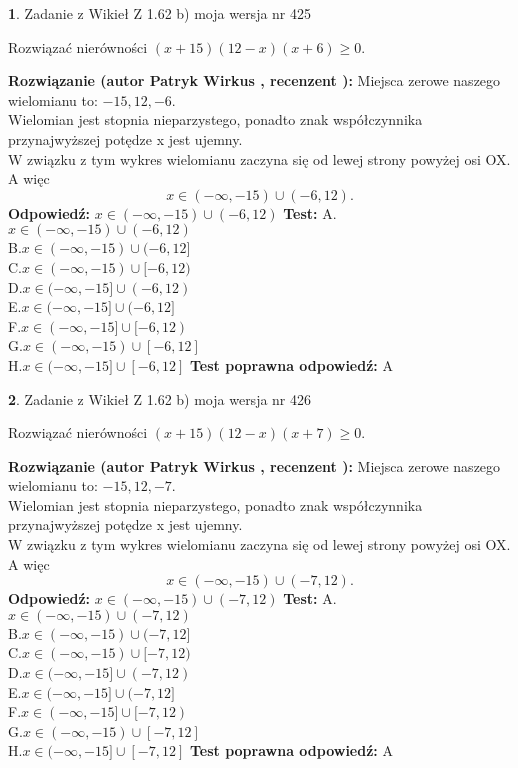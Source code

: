 \documentclass[12pt, a4paper]{article}
\theoremstyle{definition} %
\newtheorem{zad}{}
\newcommand{\zadStart}[1]{\begin{zad}#1\newline}
\newcommand{\zadStop}{\end{zad}}
\newcommand{\rozwStart}[2]{\noindent \textbf{Rozwiązanie (autor #1 , recenzent #2): }\newline}
\newcommand{\rozwStop}{\newline}
\newcommand{\odpStart}{\noindent \textbf{Odpowiedź:}\newline}
\newcommand{\odpStop}{\newline}
\newcommand{\testStart}{\noindent \textbf{Test:}\newline}
\newcommand{\testStop}{\newline}
\newcommand{\kluczStart}{\noindent \textbf{Test poprawna odpowiedź:}\newline}
\newcommand{\kluczStop}{\newline}
\begin{document}
\zadStart{Zadanie z Wikieł Z 1.62 b) moja wersja nr 425}

Rozwiązać nierówności $(x+15)(12-x)(x+6)\ge0$.
\zadStop
\rozwStart{Patryk Wirkus}{}
Miejsca zerowe naszego wielomianu to: $-15, 12, -6$.\\
Wielomian jest stopnia nieparzystego, ponadto znak współczynnika przy\linebreak najwyższej potędze x jest ujemny.\\ W związku z tym wykres wielomianu zaczyna się od lewej strony powyżej osi OX. A więc $$x \in (-\infty,-15) \cup (-6,12).$$
\rozwStop
\odpStart
$x \in (-\infty,-15) \cup (-6,12)$
\odpStop
\testStart
A.$x \in (-\infty,-15) \cup (-6,12)$\\
B.$x \in (-\infty,-15) \cup (-6,12]$\\
C.$x \in (-\infty,-15) \cup [-6,12)$\\
D.$x \in (-\infty,-15] \cup (-6,12)$\\
E.$x \in (-\infty,-15] \cup (-6,12]$\\
F.$x \in (-\infty,-15] \cup [-6,12)$\\
G.$x \in (-\infty,-15) \cup [-6,12]$\\
H.$x \in (-\infty,-15] \cup [-6,12]$
\testStop
\kluczStart
A
\kluczStop



\zadStart{Zadanie z Wikieł Z 1.62 b) moja wersja nr 426}

Rozwiązać nierówności $(x+15)(12-x)(x+7)\ge0$.
\zadStop
\rozwStart{Patryk Wirkus}{}
Miejsca zerowe naszego wielomianu to: $-15, 12, -7$.\\
Wielomian jest stopnia nieparzystego, ponadto znak współczynnika przy\linebreak najwyższej potędze x jest ujemny.\\ W związku z tym wykres wielomianu zaczyna się od lewej strony powyżej osi OX. A więc $$x \in (-\infty,-15) \cup (-7,12).$$
\rozwStop
\odpStart
$x \in (-\infty,-15) \cup (-7,12)$
\odpStop
\testStart
A.$x \in (-\infty,-15) \cup (-7,12)$\\
B.$x \in (-\infty,-15) \cup (-7,12]$\\
C.$x \in (-\infty,-15) \cup [-7,12)$\\
D.$x \in (-\infty,-15] \cup (-7,12)$\\
E.$x \in (-\infty,-15] \cup (-7,12]$\\
F.$x \in (-\infty,-15] \cup [-7,12)$\\
G.$x \in (-\infty,-15) \cup [-7,12]$\\
H.$x \in (-\infty,-15] \cup [-7,12]$
\testStop
\kluczStart
A
\kluczStop
\end{document}
